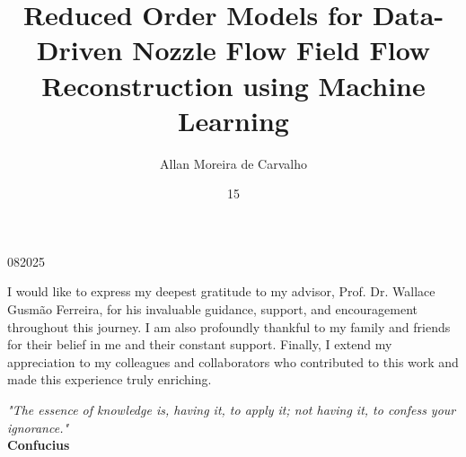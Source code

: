 \documentclass[tg, EN]{ufabcFHZh_tg}
\begin{document}
\title{Reduced Order Models for Data-Driven Nozzle Flow Field Flow Reconstruction using Machine Learning}


\author{Allan Moreira de Carvalho}{}


\date{15}{08}{2025} %


\maketitle


\frontmatter

\dedication{To my familia, for their constant support and encouragement, and to my mentors, for their invaluable guidance and inspiration.}


\begin{agradecimentos}
    I would like to express my deepest gratitude to my advisor, Prof. Dr. Wallace Gusmão Ferreira, for his invaluable guidance, support, and encouragement throughout this journey. I am also profoundly thankful to my family and friends for their belief in me and their constant support. Finally, I extend my appreciation to my colleagues and collaborators who contributed to this work and made this experience truly enriching.
\end{agradecimentos}

\begin{epigrafe}
    \vspace*{\fill}
    \begin{flushright}
        \textit{"The essence of knowledge is, having it, to apply it; not having it, to confess your ignorance."} \\ 
        \textbf{Confucius}
    \end{flushright}
\end{epigrafe}
\end{document}
